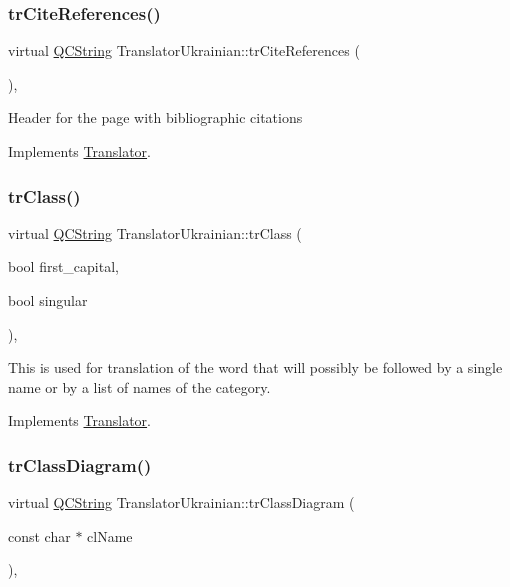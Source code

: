 \subsubsection{\texorpdfstring{trCiteReferences()}{trCiteReferences()}}
{\footnotesize\ttfamily virtual \mbox{\hyperlink{class_q_c_string}{Q\+C\+String}} Translator\+Ukrainian\+::tr\+Cite\+References (\begin{DoxyParamCaption}{ }\end{DoxyParamCaption})\hspace{0.3cm}{\ttfamily [inline]}, {\ttfamily [virtual]}}

Header for the page with bibliographic citations 

Implements \mbox{\hyperlink{class_translator}{Translator}}.

\mbox{\label{class_translator_ukrainian_a0a05294d6ee347033ef2f5a4e6d6abb0}} 
\subsubsection{\texorpdfstring{trClass()}{trClass()}}
{\footnotesize\ttfamily virtual \mbox{\hyperlink{class_q_c_string}{Q\+C\+String}} Translator\+Ukrainian\+::tr\+Class (\begin{DoxyParamCaption}\item[{bool}]{first\+\_\+capital,  }\item[{bool}]{singular }\end{DoxyParamCaption})\hspace{0.3cm}{\ttfamily [inline]}, {\ttfamily [virtual]}}

This is used for translation of the word that will possibly be followed by a single name or by a list of names of the category. 

Implements \mbox{\hyperlink{class_translator}{Translator}}.

\mbox{\label{class_translator_ukrainian_a38d572370c92f77c2777bdfc1c6f29d1}} 
\subsubsection{\texorpdfstring{trClassDiagram()}{trClassDiagram()}}
{\footnotesize\ttfamily virtual \mbox{\hyperlink{class_q_c_string}{Q\+C\+String}} Translator\+Ukrainian\+::tr\+Class\+Diagram (\begin{DoxyParamCaption}\item[{const char $\ast$}]{cl\+Name }\end{DoxyParamCaption})\hspace{0.3cm}{\ttfamily [inline]}, {\ttfamily [virtual]}}

